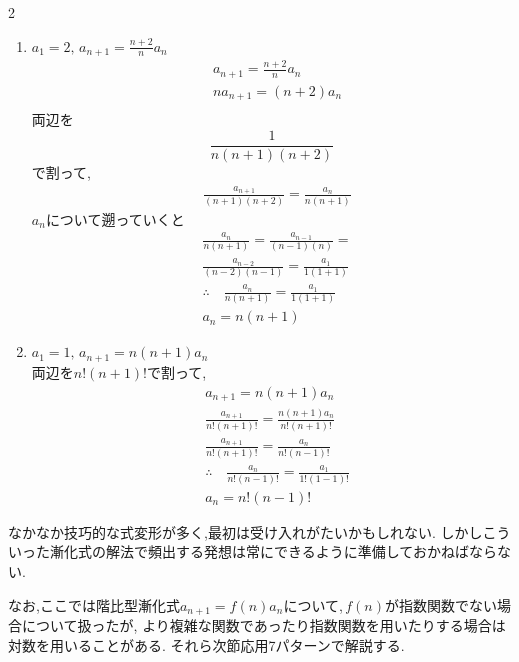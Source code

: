 \documentclass[dvipdfmx,a4paper,11pt,fleqn,openany]{jsbook}
\begin{document}
\begin{multicols*}{2}
\begin{enumerate}[label=(\arabic*),parsep=3pt]
        \item $\displaystyle a_1=2,\, a_{n+1}=\frac{n+2}{n}a_n$
              \begin{align*}
                &a_{n+1}=\frac{n+2}{n}a_n\\
                &na_{n+1}=(n+2)a_n\\
              \end{align*}
              両辺を
              \[
                \displaystyle \frac{1}{n(n+1)(n+2)}
              \]
              で割って,
              \begin{align*}        
                &\frac{a_{n+1}}{(n+1)(n+2)}=\frac{a_{n}}{n(n+1)}
              \end{align*}
              $a_n$について遡っていくと
              \begin{align*}
                &\frac{a_{n}}{n(n+1)}=\frac{a_{n-1}}{(n-1)(n)}=\\
                &\frac{a_{n-2}}{(n-2)(n-1)}=\frac{a_{1}}{1(1+1)}\\
                &\therefore \quad \frac{a_{n}}{n(n+1)}=\frac{a_{1}}{1(1+1)}\\
                &a_n=n(n+1)
              \end{align*}
        \item $\displaystyle a_1=1,\, a_{n+1}=n(n+1)a_n$\\
                両辺を$n!(n+1)!$で割って,
              \begin{align*}
                &a_{n+1}=n(n+1)a_n\\
                &\frac{a_{n+1}}{n!(n+1)!}=\frac{n(n+1)a_n}{n!(n+1)!}\\
                &\frac{a_{n+1}}{n!(n+1)!}=\frac{a_n}{n!(n-1)!}\\
                &\therefore \quad \frac{a_n}{n!(n-1)!}=\frac{a_1}{1!(1-1)!}\\
                &a_n=n!(n-1)!
              \end{align*}
      \end{enumerate}

      なかなか技巧的な式変形が多く,最初は受け入れがたいかもしれない.
      しかしこういった漸化式の解法で頻出する発想は常にできるように準備しておかねばならない.

      なお,ここでは階比型漸化式$a_{n+1}=f(n)a_n$について,\,$f(n)$が指数関数でない場合について扱ったが,
      より複雑な関数であったり指数関数を用いたりする場合は対数を用いることがある.
      それら次節応用7パターンで解説する.
      

\end{multicols*}
\end{document}
